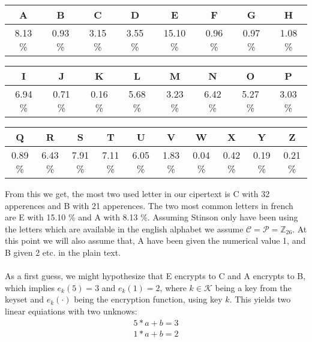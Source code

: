 \documentclass[paper=a4, fontsize=11pt]{scrartcl} %
\numberwithin{equation}{section} %
\numberwithin{figure}{section} %
\numberwithin{table}{section} %
\begin{document}
	\begin{center}
		\begin{tabular}{c|c|c|c|c|c|c|c}
			A & B & C & D & E & F & G & H \\ \hline
			8.13 \% & 0.93 \% & 3.15 \% & 3.55 \% & 15.10 \% & 0.96 \% & 0.97 \% & 1.08 \% 
		\end{tabular} 
	\end{center}
	
	\begin{center}
		\begin{tabular}{c|c|c|c|c|c|c|c}
			I & J & K & L & M & N & O & P \\ \hline
			6.94 \% & 0.71 \% & 0.16 \% & 5.68 \% & 3.23 \% & 6.42 \% & 5.27 \% & 3.03 \% 
		\end{tabular}
	\end{center}
	
	\begin{center}
		\begin{tabular}{c|c|c|c|c|c|c|c|c|c}
			 Q & R & S & T & U & V & W & X & Y & Z  \\ \hline
			 0.89 \% & 6.43 \% & 7.91 \% & 7.11 \% & 6.05 \% & 1.83 \% & 0.04 \% & 0.42 \% & 0.19 \% & 0.21 \%
		\end{tabular}
	\end{center}
	
	From this we get, the most two used letter in our cipertext is C with 32 apperences and B with 21 apperences. The two most common letters in french are E with 15.10 \% and A with 8.13 \%. Assuming Stinson only have been using the letters which are available in the english alphabet we assume $\mathcal{C}=\mathcal{P}=\mathbb{Z}_{26}$. At this point we will also assume that, A have been given the numerical value 1, and B given 2 etc. in the plain text.
	\\ \\
	As a first guess, we might hypothesize that E encrypts to C and A encrypts to B, which implies $e_k(5)=3$ and $e_k(1)=2$, where $k\in\mathcal{K}$ being a key from the keyset and $e_k(\cdot)$ being the encryption function, using key $k$. This yields two linear equiations with two unknows:
	\begin{align*}
	5*a+b=3 \\
	1*a+b=2
	\end{align*}
\end{document}
